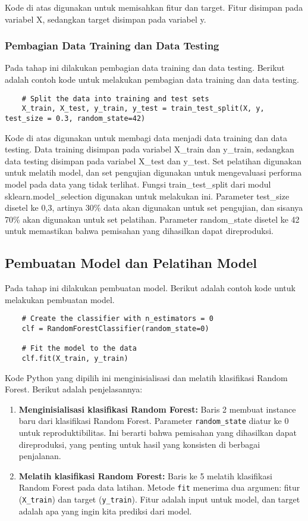     Kode di atas digunakan untuk memisahkan fitur dan target. Fitur disimpan pada variabel X, sedangkan target disimpan pada variabel y.

\subsubsection{Pembagian Data Training dan Data Testing}
Pada tahap ini dilakukan pembagian data training dan data testing. Berikut adalah contoh kode untuk melakukan pembagian data training dan data testing.
\begin{lstlisting}
    # Split the data into training and test sets
    X_train, X_test, y_train, y_test = train_test_split(X, y, test_size = 0.3, random_state=42)
\end{lstlisting}

    Kode di atas digunakan untuk membagi data menjadi data training dan data testing. Data training disimpan pada variabel X\_train dan y\_train, sedangkan data testing disimpan pada variabel X\_test dan y\_test.
    Set pelatihan digunakan untuk melatih model, dan set pengujian digunakan untuk mengevaluasi performa model pada data yang tidak terlihat. 
    Fungsi train\_test\_split dari modul sklearn.model\_selection digunakan untuk melakukan ini. Parameter test\_size disetel ke 0,3, artinya 30\% data akan digunakan untuk set pengujian, dan sisanya 70\% akan digunakan untuk set pelatihan. Parameter random\_state disetel ke 42 untuk memastikan bahwa pemisahan yang dihasilkan dapat direproduksi.

\subsection{Pembuatan Model dan Pelatihan Model}
Pada tahap ini dilakukan pembuatan model. Berikut adalah contoh kode untuk melakukan pembuatan model.
\begin{lstlisting}
    # Create the classifier with n_estimators = 0
    clf = RandomForestClassifier(random_state=0)

    # Fit the model to the data
    clf.fit(X_train, y_train)
\end{lstlisting}
    
Kode Python yang dipilih ini menginisialisasi dan melatih klasifikasi Random Forest. Berikut adalah penjelasannya:

\begin{enumerate}
\item \textbf{Menginisialisasi klasifikasi Random Forest:} Baris 
2 membuat instance baru dari klasifikasi Random Forest. Parameter \texttt{random\_state} diatur ke 0 untuk reproduktibilitas. Ini berarti bahwa pemisahan yang dihasilkan dapat direproduksi, yang penting untuk hasil yang konsisten di berbagai penjalanan.
\item \textbf{Melatih klasifikasi Random Forest:} Baris ke 5 melatih klasifikasi Random Forest pada data latihan. Metode \texttt{fit} menerima dua argumen: fitur (\texttt{X\_train}) dan target (\texttt{y\_train}). Fitur adalah input untuk model, dan target adalah apa yang ingin kita prediksi dari model.
\end{enumerate}

